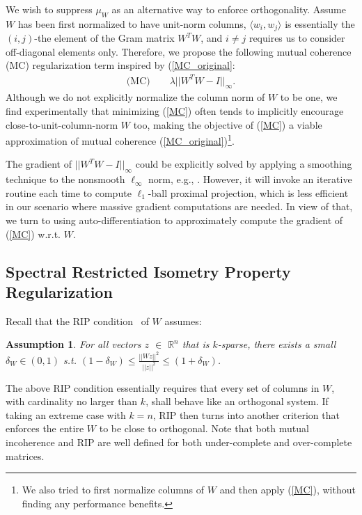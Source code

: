\documentclass{article}
\newcommand{\R}{\mathbb{R}}
\newcounter{ass_counter}
\newtheorem{assumption}[ass_counter]{Assumption}
\begin{document}
We wish to suppress $\mu_W$ as an alternative way to enforce orthogonality. Assume $W$ has been first normalized to have unit-norm columns, $\langle w_i, w_j \rangle$ is essentially the $(i,j)$-the element of the Gram matrix $W^TW$, and $i \neq j$ requires us to consider off-diagonal elements only. Therefore, we propose the following mutual coherence (MC) regularization term inspired by (\ref{MC_original}:
\begin{equation}
\begin{aligned}
\text{(MC)} \qquad \lambda||W^TW - I||_\infty.
\end{aligned}
\label{MC}
\end{equation}
Although we do not explicitly normalize the column norm of $W$ to be one, we find experimentally that minimizing (\ref{MC}) often tends to implicitly encourage close-to-unit-column-norm $W$ too, making the objective of (\ref{MC}) a viable approximation of mutual coherence (\ref{MC_original})\footnote{We also tried to first normalize columns of $W$ and then apply (\ref{MC}), without finding any performance benefits.}.

The gradient of $||W^TW - I||_\infty$ could be explicitly solved by applying a smoothing technique to the nonsmooth $\ell_\infty$ norm, e.g., \cite{lin2015optimized}. However, it will invoke an iterative routine each time to compute $\ell_1$-ball proximal projection, which is less efficient in our scenario where massive gradient computations are needed. In view of that, we turn to using auto-differentiation to approximately compute the gradient of (\ref{MC}) w.r.t. $W$.

\subsection{Spectral Restricted Isometry Property Regularization}

Recall that the RIP condition~\cite{candes2005decoding} of $W$ assumes:
\begin{assumption}\label{asm}
    For all vectors $z$ $ \in $ $\R^n$ that is $k$-sparse, there exists a small $\delta_W \in (0,1)$ s.t. $(1-\delta_W) \leq \frac{||Wz||^2}{||z||^2} \leq (1+\delta_W)$.
\end{assumption}
The above RIP condition essentially requires that every set of columns in $W$, with cardinality no larger than $k$, shall behave like an orthogonal system. If taking an extreme case with $k = n$, RIP then turns into another criterion that enforces the entire $W$ to be close to orthogonal. Note that both mutual incoherence and RIP are well defined for both under-complete and over-complete matrices.
\end{document}
